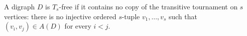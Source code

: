 \begin{definition}
A digraph \(D\) is \(T_s\)-free if it contains no copy of the transitive tournament on \(s\) vertices: there is no injective ordered \(s\)-tuple \(v_1,\ldots,v_s\) such that \((v_i,v_j)\in A(D)\) for every \(i<j\).
\end{definition}

